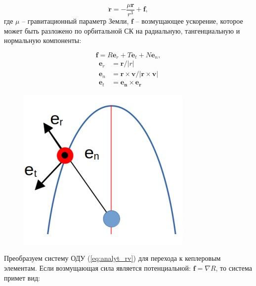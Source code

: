 \begin{equation}
    \ddot{\mathbf{r}} = - \frac{\mu \mathbf{r}}{r^3} + \mathbf{f},
    \label{eq:analyt_rv}
\end{equation}
где $\mu$ -- гравитационный параметр Земли, $\mathbf{f}$ -- возмущающее ускорение, которое может быть разложено по орбитальной СК на радиальную, тангенциальную и нормальную компоненты:

\begin{equation*}
    \mathbf{f} = R \mathbf{e}_r + T \mathbf{e}_t + N \mathbf{e}_n,
\end{equation*}
\begin{align*}
    \mathbf{e}_r &= \mathbf{r} / |r| \\
    \mathbf{e}_n &= \mathbf{r} \times \mathbf{v} / |\mathbf{r} \times \mathbf{v}| \\
    \mathbf{e}_t &= \mathbf{e_n} \times \mathbf{e_r}
\end{align*}

\begin{figure}[h!]
    \centering
    \includegraphics[width=0.4\linewidth]{../images/review/orbital_system.jpg}
    \label{fig:orbital_system}
\end{figure}

Преобразуем систему ОДУ (\ref{eq:analyt_rv}) для перехода к кеплеровым элементам.
Если возмущающая сила является потенциальной: $\mathbf{f} = \nabla R$, то система примет вид:

